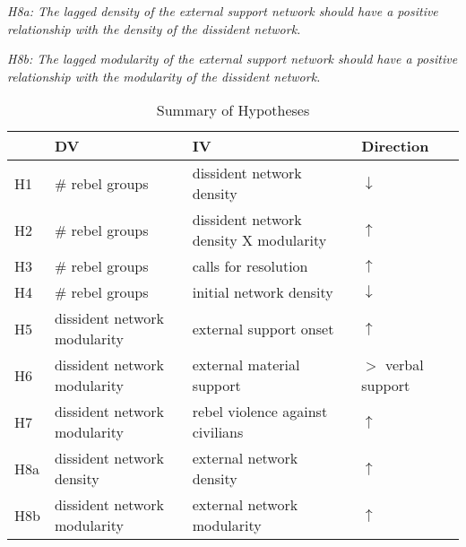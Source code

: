 \noindent \textit{H8a: The lagged density of the external support network should have a positive relationship with the density of the dissident network.}

\noindent \textit{H8b: The lagged modularity of the external support network should have a positive relationship with the modularity of the dissident network.}

\begin{table}
\centering
\begin{tabular}{llll}
\hline
 & DV & IV & Direction\\
\hline
H1 & \# rebel groups & dissident network density & $\downarrow$ \\
H2 & \# rebel groups & dissident network density X modularity & $\uparrow$\\
H3 & \# rebel groups & calls for resolution & $\uparrow$\\
H4 & \# rebel groups & initial network density & $\downarrow$\\
H5 & dissident network modularity & external support onset & $\uparrow$\\
H6 & dissident network modularity & external material support & $>$ verbal support\\
H7 & dissident network modularity & rebel violence against civilians & $\uparrow$\\
H8a & dissident network density & external network density & $\uparrow$\\
H8b & dissident network modularity & external network modularity & $\uparrow$\\
\hline
\end{tabular}
\caption{Summary of Hypotheses}
\end{table}
